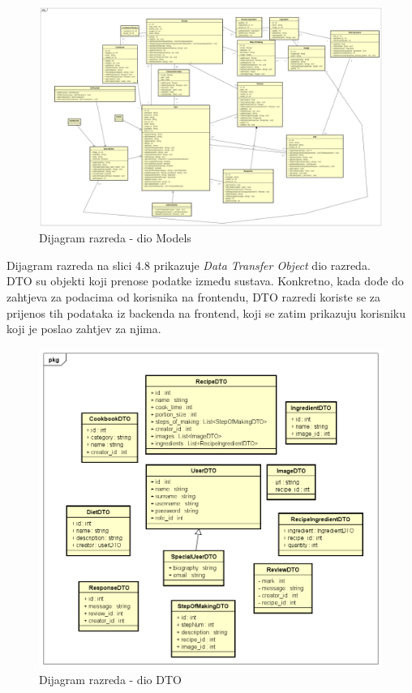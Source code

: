 			
			\begin{figure}[H]
			\includegraphics[scale=0.2]{dijagrami/UML_dijagram_razreda_models.png} %
			\centering
			\caption{Dijagram razreda - dio Models}
			\label{Dijagram razreda - dio Models}
		\end{figure}
		
Dijagram razreda na slici 4.8 prikazuje \textit{Data Transfer Object} dio razreda. \\
DTO su objekti koji prenose podatke između sustava. Konkretno, kada dođe do zahtjeva za podacima od korisnika na frontendu, DTO razredi koriste se za prijenos tih podataka iz backenda na frontend, koji se zatim prikazuju korisniku koji je poslao zahtjev za njima.

			\begin{figure}[H]
			\includegraphics[scale=0.2]{dijagrami/UML_dijagram_razreda_dtos.png} %
			\centering
			\caption{Dijagram razreda - dio DTO}
			\label{Dijagram razreda - dio DTO}
		\end{figure}
		
